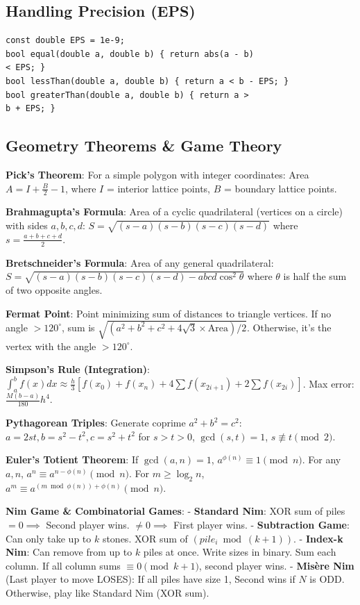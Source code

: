 \subsection{Handling Precision (EPS)}
\begin{verbatim}
const double EPS = 1e-9;
bool equal(double a, double b) { return abs(a - b)
< EPS; }
bool lessThan(double a, double b) { return a < b - EPS; }
bool greaterThan(double a, double b) { return a >
b + EPS; }
\end{verbatim}
\subsection{Geometry Theorems \texorpdfstring{\&}{\&} Game Theory}

\textbf{Pick's Theorem}: For a simple polygon with integer coordinates:
Area $A = I + \frac{B}{2} - 1$, where $I$ = interior lattice points, $B$ = boundary lattice points.

\textbf{Brahmagupta's Formula}: Area of a cyclic quadrilateral (vertices on a circle) with sides $a, b, c, d$:
$S = \sqrt{(s-a)(s-b)(s-c)(s-d)}$ where $s = \frac{a+b+c+d}{2}$.

\textbf{Bretschneider's Formula}: Area of any general quadrilateral:
$S = \sqrt{(s-a)(s-b)(s-c)(s-d) - abcd \cos^2\theta}$ where $\theta$ is half the sum of two opposite angles.

\textbf{Fermat Point}: Point minimizing sum of distances to triangle vertices.
If no angle $> 120^\circ$, sum is $\sqrt{(a^2+b^2+c^2 + 4\sqrt{3}\times \text{Area})/2}$. Otherwise, it's the vertex with the angle $> 120^\circ$.

\textbf{Simpson's Rule (Integration)}:
$\int_a^b f(x) dx \approx \frac{h}{3} [f(x_0) + f(x_n) + 4\sum f(x_{2i+1}) + 2\sum f(x_{2i})]$. Max error: $\frac{M(b-a)}{180}h^4$.

\textbf{Pythagorean Triples}: Generate coprime $a^2+b^2=c^2$:
$a = 2st, b = s^2-t^2, c = s^2+t^2$ for $s>t>0$, $\gcd(s,t)=1$, $s \not\equiv t \pmod 2$.

\textbf{Euler's Totient Theorem}:
If $\gcd(a,n)=1$, $a^{\phi(n)} \equiv 1 \pmod n$. For any $a,n$, $a^n \equiv a^{n-\phi(n)} \pmod n$.
For $m \ge \log_2 n$, $a^m \equiv a^{(m \bmod \phi(n)) + \phi(n)} \pmod n$.

\textbf{Nim Game \& Combinatorial Games}:
- \textbf{Standard Nim}: XOR sum of piles $= 0 \implies$ Second player wins. $\neq 0 \implies$ First player wins.
- \textbf{Subtraction Game}: Can only take up to $k$ stones. XOR sum of $(pile_i \bmod (k+1))$.
- \textbf{Index-k Nim}: Can remove from up to $k$ piles at once. Write sizes in binary. Sum each column. If all column sums $\equiv 0 \pmod{k+1}$, second player wins.
- \textbf{Mis\`{e}re Nim} (Last player to move LOSES): If all piles have size 1, Second wins if $N$ is ODD. Otherwise, play like Standard Nim (XOR sum).
